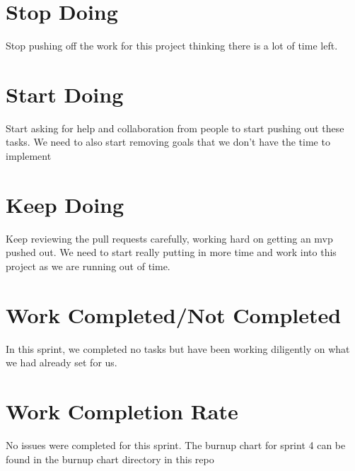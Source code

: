 \documentclass[12pt,letterpaper]{article}
\begin{document}
	\section*{Stop Doing}
		Stop pushing off the work for this project thinking there is a lot of time left.
	\section*{Start Doing}
		Start asking for help and collaboration from people to start pushing out these tasks. We need to also start removing goals that we don't have the time to implement
	\section*{Keep Doing}
		Keep reviewing the pull requests carefully, working hard on getting an mvp pushed out. We need to start really putting in more time and work into this project as we are running out of time.
	\section*{Work Completed/Not Completed}
		In this sprint, we completed no tasks but have been working diligently on what we had already set for us.
	\section*{Work Completion Rate}
		No issues were completed for this sprint. The burnup chart for sprint 4 can be found in the burnup chart directory in this repo
\end{document}
